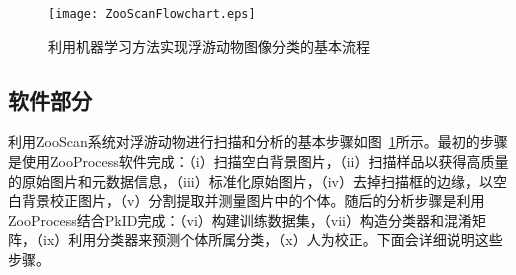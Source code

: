 \begin{figure}[!ht] %
\centering
\texttt{[image: ZooScanFlowchart.eps]}
\caption{利用机器学习方法实现浮游动物图像分类的基本流程}
\label{fig: ZooScanFlowchart}
\end{figure}

\subsection{软件部分}
\label{2.3.3}

利用ZooScan系统对浮游动物进行扫描和分析的基本步骤如图~\ref{fig: ZooScanFlowchart}所示。最初的步骤是使用ZooProcess软件完成：（i）扫描空白背景图片，（ii）扫描样品以获得高质量的原始图片和元数据信息，（iii）标准化原始图片，（iv）去掉扫描框的边缘，以空白背景校正图片，（v）分割提取并测量图片中的个体。随后的分析步骤是利用ZooProcess结合PkID完成：（vi）构建训练数据集，（vii）构造分类器和混淆矩阵，（ix）利用分类器来预测个体所属分类，（x）人为校正。下面会详细说明这些步骤。

